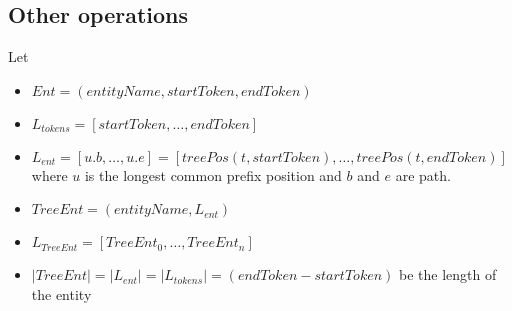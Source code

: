 \begin{itemize}

\end{itemize}

\FloatBarrier

\subsection{Other operations}

Let
\begin{itemize}
	\item $Ent = (entityName, startToken, endToken)$
	\item $L_{tokens} = [startToken, \dots, endToken]$
	\item $L_{ent} = [ u.b, \dots, u.e]= [ treePos(t, startToken), \dots ,  treePos(t, endToken)]$ where $u$ is the longest common prefix position and $b$ and $e$ are path.
	\item $TreeEnt = (entityName, L_{ent})$
	\item $L_{TreeEnt} = [TreeEnt_0, \dots, TreeEnt_n]$
	\item $|TreeEnt| = |L_{ent}| = |L_{tokens}| = (endToken - startToken)$ be the length of the entity
\end{itemize}


